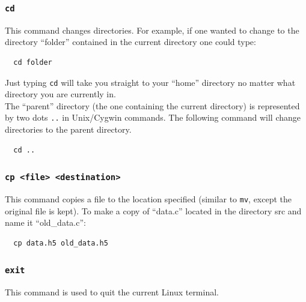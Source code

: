 \documentclass[10pt]{article}
\begin{document}
\subsubsection{\texttt{cd}}
\noindent This command changes directories.  For example, if one wanted to change to the directory ``folder'' contained in the current directory one could type:

\begin{verbatim}
  cd folder
\end{verbatim}

\noindent Just typing \verb|cd| will take you straight to your ``home'' directory no matter what directory you are currently in.\\

\noindent The ``parent'' directory (the one containing the current directory) is represented by two dots \texttt{..} in Unix/Cygwin commands.  The following command will change directories to the parent directory.
\begin{verbatim}
  cd ..
\end{verbatim}
  
\subsubsection{\texttt{cp <file> <destination>}}
\noindent This command copies a file to the location specified (similar to \texttt{mv}, except the original file is kept).  To make a copy of ``data.c'' located in the directory src and name it ``old\_data.c'':

\begin{verbatim}
  cp data.h5 old_data.h5
\end{verbatim}

\subsubsection{\texttt{exit}}
\noindent This command is used to quit the current Linux terminal.

%
      
\end{document}
